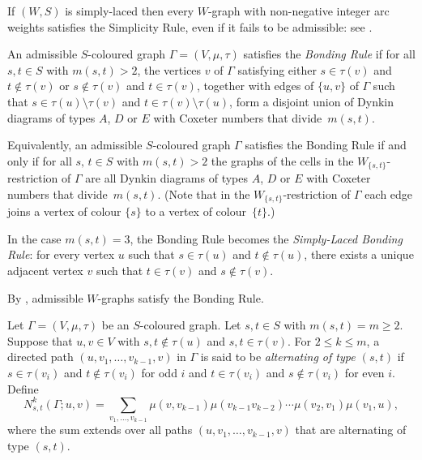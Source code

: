 \documentclass[ALCO,ThmDefs,Unicode,epreuves]{cedram}
\newcommand{\citex}[2]{\cite[#1]{#2}}
\begin{document}
If $(W,S)$ is simply-laced then every $W\!$-graph with non-negative
integer arc weights satisfies the Simplicity Rule, even if it fails to be
admissible: see \cite[Remark~4.3]{stem:addwgraph}.

\begin{defi}[{\citex{Definition~2.4}{stem:morewgraph}}]\label{bonding}
An admissible $S$-coloured graph $\Gamma = (V,\mu,\tau)$ satisfies the
\emph{Bonding Rule}
if for all $s,t\in S$ with $m(s,t)>2$,
the vertices $v$ of $\Gamma$ satisfying either $s\in\tau(v)$ and $t\notin\tau(v)$
or $s\notin\tau(v)$ and $t\in\tau(v)$,
together with edges of $\{u,v\}$ of $\Gamma$ such that
$s\in\tau(u)\setminus\tau(v)$ and $t\in\tau(v)\setminus\tau(u)$,
form a disjoint union of Dynkin diagrams of types $A$, $D$ or $E$
with Coxeter numbers that divide~$m(s,t)$.
\end{defi}

Equivalently, an admissible $S$-coloured graph $\Gamma$ satisfies the
Bonding Rule if and only if for all $s,\,t\in S$ with $m(s,t)>2$ the
graphs of the cells in the $W_{\{s,t\}}$-restriction of $\Gamma$ are all Dynkin
diagrams of types $A$, $D$ or $E$ with Coxeter numbers that divide~$m(s,t)$.
(Note that in the $W_{\{s,t\}}$-restriction of $\Gamma$ each edge joins
a vertex of colour $\{s\}$ to a vertex of colour~$\{t\}$.)

\begin{rema}\label{molecularbondingrule}
In the case $m(s,t)=3$, the
Bonding Rule
becomes the
\emph{Simply-Laced Bonding Rule}:
for every vertex $u$ such that
$s\in\tau(u)$ and $t\notin\tau(u)$, there exists a unique
adjacent vertex $v$ such that $t\in\tau(v)$ and $s\notin\tau(v)$.
\end{rema}
By \cite[Proposition~4.4]{stem:addwgraph}, admissible $W\!$-graphs satisfy the
Bonding Rule.

Let $\Gamma=(V,\mu,\tau)$ be an $S$-coloured graph. Let $s,t\in S$ with
$m(s,t) = m \geqslant 2$. Suppose that $u,v\in V$ with $s,t\notin \tau(u)$
and $s,t\in\tau(v)$. For $2\leqslant k\leqslant m$, a directed path
$(u,v_1,\ldots,v_{k-1},v)$ in $\Gamma$ is said to be \emph{alternating of type
$(s,t)$} if $s\in \tau(v_i)$ and $t\notin\tau(v_i)$ for odd $i$ and
$t\in\tau(v _i)$ and $s\notin\tau(v_i)$ for even $i$. Define
\begin{equation}\label{altsums}
N^k_{s,t}(\Gamma;u,v)=
\sum_{v_1,\ldots,v_{k-1}}\mu(v,v_{k-1})\mu(v_{k-1}v_{k-2})\cdots \mu(v_2,v_1)\mu(v_1,u),
\end{equation}
where the sum extends over all paths $(u,v_1,\ldots,v_{k-1},v)$ that are
alternating of type $(s,t)$.
\end{document}
